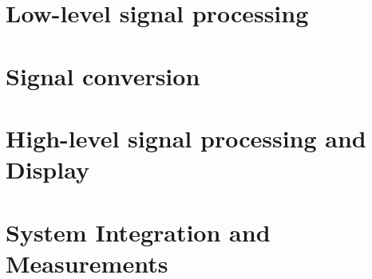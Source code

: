 \documentclass[a4paper,12pt]{report}
\begin{document}
\chapter{Low-level signal processing} \label{chap:llsp}


\chapter{Signal conversion} \label{chap:sc}


\chapter{High-level signal processing and Display} \label{chap:hlsp}


\chapter{System Integration and Measurements} \label{chap:integration}


\appendix






\end{document}

